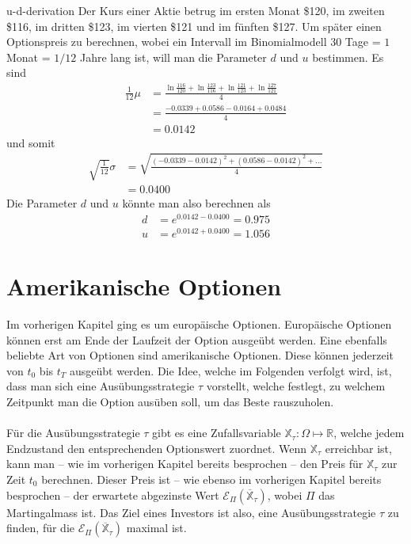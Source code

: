 \documentclass[11pt]{report} %
\begin{document}
\begin{Beispiel}{}{u-d-derivation}
    Der Kurs einer Aktie betrug im ersten Monat \$120, im zweiten \$116, im dritten \$123, im vierten \$121 und im fünften \$127. Um später einen Optionspreis zu berechnen, wobei ein Intervall im Binomialmodell 30 Tage = $1$ Monat = $1/12$ Jahre lang ist, will man die Parameter $d$ und $u$ bestimmen. Es sind
    \begin{align*}
        \frac{1}{12}\mu  &= \frac{\ln{\frac{116}{120}}+\ln{\frac{123}{116}}+\ln{\frac{121}{123}}+\ln{\frac{127}{121}}}{4}\\
        &=\frac{-0.0339+0.0586-0.0164+0.0484}{4}\\
        &=0.0142
    \end{align*}
    und somit
    \begin{align*}
        \sqrt{\frac{1}{12}}\sigma&=\sqrt{\frac{(-0.0339-0.0142)^2+(0.0586-0.0142)^2+\ldots}{4}}\\
        &=0.0400
    \end{align*}
    Die Parameter $d$ und $u$ könnte man also berechnen als
    \begin{align*}
        d&=e^{0.0142-0.0400}=0.975\\
        u&=e^{0.0142+0.0400}=1.056
    \end{align*}
    \end{Beispiel}
\chapter{Amerikanische Optionen}
Im vorherigen Kapitel ging es um europäische Optionen. Europäische Optionen können erst am Ende der Laufzeit der Option ausgeübt werden. Eine ebenfalls beliebte Art von Optionen sind amerikanische Optionen. Diese können jederzeit von $t_0$ bis $t_T$ ausgeübt werden. Die Idee, welche im Folgenden verfolgt wird, ist, dass man sich eine Ausübungsstrategie $\tau$ vorstellt, welche festlegt, zu welchem Zeitpunkt man die Option ausüben soll, um das Beste rauszuholen.\\\\Für die Ausübungsstrategie $\tau$ gibt es eine Zufallsvariable $\mathbb{X}_\tau:\Omega\mapsto\mathbb{R}$, welche jedem Endzustand den entsprechenden Optionswert zuordnet. Wenn $\mathbb{X}_\tau$ erreichbar ist, kann man -- wie im vorherigen Kapitel bereits besprochen -- den Preis für $\mathbb{X}_\tau$ zur Zeit $t_0$ berechnen. Dieser Preis ist -- wie ebenso im vorherigen Kapitel bereits besprochen -- der erwartete abgezinste Wert $\mathcal{E}_\Pi(\overline{\mathbb{X}}_\tau)$, wobei $\Pi$ das Martingalmass ist. Das Ziel eines Investors ist also, eine Ausübungsstrategie $\tau$ zu finden, für die $\mathcal{E}_\Pi(\overline{\mathbb{X}}_\tau)$ maximal ist.
\end{document}
